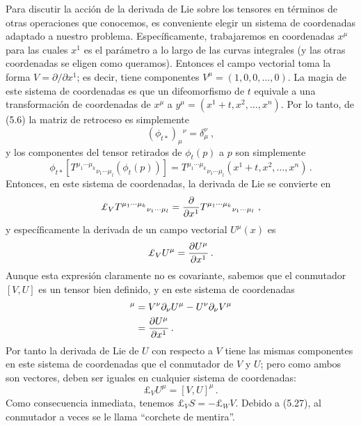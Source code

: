 \documentclass[11pt,b5paper,openany,twoside]{book}
\newcommand{\p}[1]{{\partial_{#1}}}
\def\lie{\pounds}
\begin{document}
Para discutir la acción de la derivada de Lie sobre los tensores en términos de otras operaciones que conocemos, es conveniente elegir un sistema de coordenadas adaptado a nuestro problema.
Específicamente, trabajaremos en coordenadas $x^\mu$ para las cuales $x^1$ es el parámetro a lo largo de las curvas integrales (y las otras coordenadas se eligen como queramos).
Entonces el campo vectorial toma la forma $V=\partial/\partial x^1$; es decir, tiene componentes $V^\mu =(1,0,0, \ldots, 0)$.
La magia de este sistema de coordenadas es que un difeomorfismo de $t$ equivale a una transformación de coordenadas de $x^\mu$ a $y^\mu=(x^1+t,x^2,\ldots,x^n)$.
Por lo tanto, de (5.6) la matriz de retroceso es simplemente
\begin{equation}
(\phi_{t*})_\mu{}^\nu = \delta^\nu_\mu\ ,\label{5.22}
\end{equation}
y los componentes del tensor retirados de $\phi_t(p)$ a $p$ son simplemente
\begin{equation}
\phi_{t*}[T^{\mu_1 \cdots \mu_k}{}_{\nu_1 \cdots \mu_l}(\phi_t(p))]
=T^{\mu_1 \cdots \mu_k}{}_{\nu_1 \cdots \mu_l}(x^1+t,x^2,\ldots,x^n)
\,.\label{5.23}
\end{equation}
Entonces, en este sistema de coordenadas, la derivada de Lie se convierte en
\begin{equation}
\lie_VT^{\mu_1 \cdots \mu_k}{}_{\nu_1 \cdots \mu_l} =
{{\partial}\over{\partial x^1}}
T^{\mu_1 \cdots \mu_k}{}_{\nu_1 \cdots \mu_l}\ ,\label{5.24}
\end{equation}
y específicamente la derivada de un campo vectorial $U^\mu(x)$ es
\begin{equation}
\lie_VU^\mu = {{\partial U^\mu}\over{\partial x^1}}\,.\label{5.25}
\end{equation}
Aunque esta expresión claramente no es covariante, sabemos que el conmutador $[V,U]$ es un tensor bien definido, y en este sistema de coordenadas
\begin{align}
[V,U]^\mu  &=  V^\nu\p\nu U^\mu-U^\nu\p\nu V^\mu \notag \\
&=  {{\partial U^\mu}\over{\partial x^1}}\,.\label{5.26}
\end{align}
Por tanto la derivada de Lie de $U$ con respecto a $V$ tiene las mismas componentes en este sistema de coordenadas que el conmutador de $V$ y $U$; pero como ambos son vectores, deben ser iguales en cualquier sistema de coordenadas:
\begin{equation}
\lie_VU^\mu = [V,U]^\mu\,.\label{5.27}
\end{equation}
Como consecuencia inmediata, tenemos $\lie_VS=-\lie_WV$.
Debido a (5.27), al conmutador a veces se le llama ``corchete de mentira''.
\end{document}
